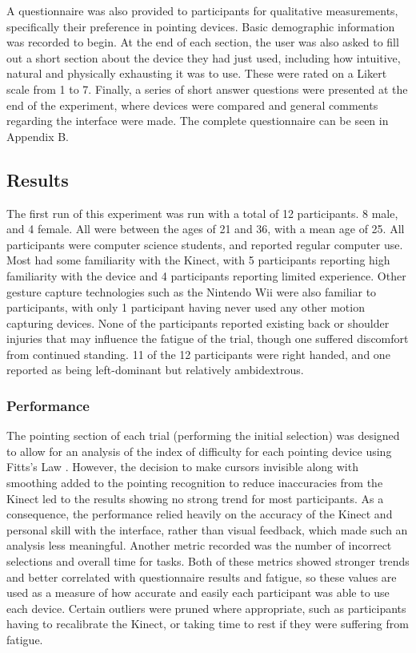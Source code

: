 A questionnaire was also provided to participants for qualitative measurements, specifically their preference in pointing devices. Basic demographic information was recorded to begin. At the end of each section, the user was also asked to fill out a short section about the device they had just used, including how intuitive, natural and physically exhausting it was to use. These were rated on a Likert scale from 1 to 7. Finally, a series of short answer questions were presented at the end of the experiment, where devices were compared and general comments regarding the interface were made. The complete questionnaire can be seen in Appendix B.

\subsection{Results}

The first run of this experiment was run with a total of 12 participants. 8 male, and 4 female. All were between the ages of 21 and 36, with a mean age of 25. All participants were computer science students, and reported regular computer use. Most had some familiarity with the Kinect, with 5 participants reporting high familiarity with the device and 4 participants reporting limited experience. Other gesture capture technologies such as the Nintendo Wii were also familiar to participants, with only 1 participant having never used any other motion capturing devices.
None of the participants reported existing back or shoulder injuries that may influence the fatigue of the trial, though one suffered discomfort from continued standing. 11 of the 12 participants were right handed, and one reported as being left-dominant but relatively ambidextrous.

\subsubsection{Performance}

The pointing section of each trial (performing the initial selection) was designed to allow for an analysis of the index of difficulty for each pointing device using Fitts's Law . However, the decision to make cursors invisible along with smoothing added to the pointing recognition to reduce inaccuracies from the Kinect led to the results showing no strong trend for most participants. As a consequence, the performance relied heavily on the accuracy of the Kinect and personal skill with the interface, rather than visual feedback, which made such an analysis less meaningful. Another metric recorded was the number of incorrect selections and overall time for tasks. Both of these metrics showed stronger trends and better correlated with questionnaire results and fatigue, so these values are used as a measure of how accurate and easily each participant was able to use each device. Certain outliers were pruned where appropriate, such as participants having to recalibrate the Kinect, or taking time to rest if they were suffering from fatigue.

